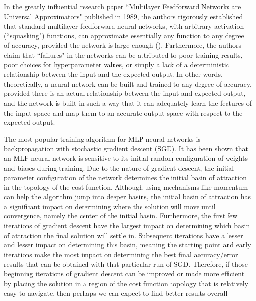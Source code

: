 \documentclass[twoside,11pt]{article}
\begin{document}
In the greatly influential research paper ``Multilayer Feedforward Networks are Universal Approximators" published in 1989, the authors rigorously established that standard multilayer feedforward neural networks, with arbitrary activation (``squashing") functions, can approximate essentially any function to any degree of accuracy, provided the network is large enough (\cite{hornik1989multilayer}). Furthermore, the authors claim that ``failures" in the networks can be attributed to poor training results, poor choices for hyperparameter values, or simply a lack of a deterministic relationship between the input and the expected output. In other words, theoretically, a neural network can be built and trained to any degree of accuracy, provided there is an actual relationship between the input and expected output, and the network is built in such a way that it can adequately learn the features of the input space and map them to an accurate output space with respect to the expected output.

The most popular training algorithm for MLP neural networks is backpropagation with stochastic gradient descent (SGD). It has been shown that an MLP neural network is sensitive to its initial random configuration of weights and biases during training. Due to the nature of gradient descent, the initial parameter configuration of the network determines the initial basin of attraction in the topology of the cost function. Although using mechanisms like momentum can help the algorithm jump into deeper basins, the initial basin of attraction has a significant impact on determining where the solution will move until convergence, namely the center of the initial basin. Furthermore, the first few iterations of gradient descent have the largest impact on determining which basin of attraction the final solution will settle in. Subsequent iterations have a lesser and lesser impact on determining this basin, meaning the starting point and early iterations make the most impact on determining the best final accuracy/error results that can be obtained with that particular run of SGD. Therefore, if those beginning iterations of gradient descent can be improved or made more efficient by placing the solution in a region of the cost function topology that is relatively easy to navigate, then perhaps we can expect to find better results overall.
\end{document}

